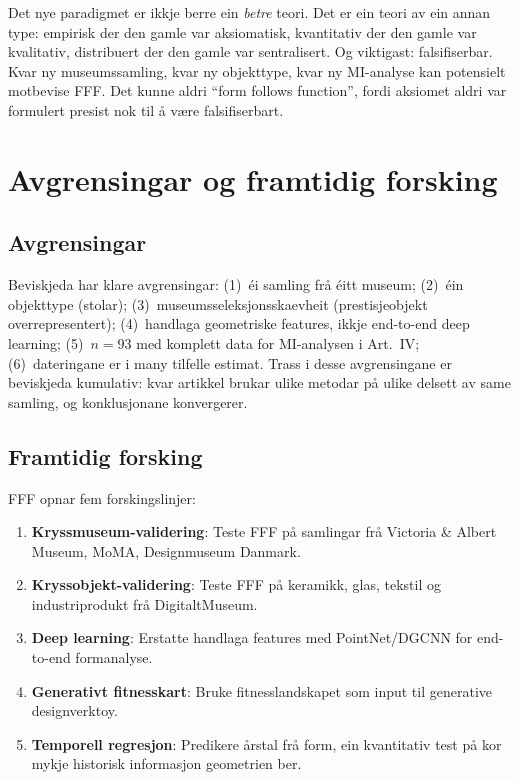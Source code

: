 \documentclass[12pt,a4paper]{article}
\begin{document}
\noindent
Det nye paradigmet er ikkje berre ein \emph{betre} teori. Det er ein teori av ein annan type: empirisk der den gamle var aksiomatisk, kvantitativ der den gamle var kvalitativ, distribuert der den gamle var sentralisert. Og viktigast: falsifiserbar. Kvar ny museumssamling, kvar ny objekttype, kvar ny MI-analyse kan potensielt motbevise FFF. Det kunne aldri \enquote{form follows function}, fordi aksiomet aldri var formulert presist nok til \aa{} v\ae{}re falsifiserbart.

\section{Avgrensingar og framtidig forsking}
\label{sec:avgrensingar}

\subsection{Avgrensingar}

Beviskjeda har klare avgrensingar: (1)~\'{e}i samling fr\aa{} \'{e}itt museum; (2)~\'{e}in objekttype (stolar); (3)~museumsseleksjonsskaevheit (prestisje\-objekt overrepresentert); (4)~handlaga geometriske features, ikkje end-to-end deep learning; (5)~$n = 93$ med komplett data for MI-analysen i Art.~IV; (6)~dateringane er i many tilfelle estimat. Trass i desse avgrensingane er beviskjeda kumulativ: kvar artikkel brukar ulike metodar p\aa{} ulike delsett av same samling, og konklusjonane konvergerer.

\subsection{Framtidig forsking}

FFF opnar fem forskingslinjer:

\begin{enumerate}[nosep]
    \item \textbf{Kryssmuseum-validering}: Teste FFF p\aa{} samlingar fr\aa{} Victoria \& Albert Museum, MoMA, Designmuseum Danmark.
    \item \textbf{Kryssobjekt-validering}: Teste FFF p\aa{} keramikk, glas, tekstil og industriprodukt fr\aa{} DigitaltMuseum.
    \item \textbf{Deep learning}: Erstatte handlaga features med PointNet/DGCNN for end-to-end formanalyse.
    \item \textbf{Generativt fitnesskart}: Bruke fitnesslandskapet som input til generative designverktoy.
    \item \textbf{Temporell regresjon}: Predikere \aa{}rstal fr\aa{} form, ein kvantitativ test p\aa{} kor mykje historisk informasjon geometrien ber.
\end{enumerate}
\end{document}
